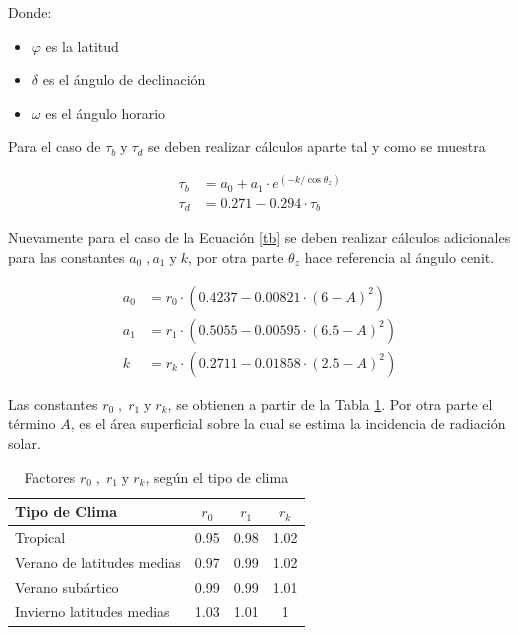 Donde:

\begin{itemize}
    \item $\varphi$ es la latitud
    \item $\delta$ es el ángulo de declinación
    \item $\omega$ es el ángulo horario
\end{itemize}

Para el caso de $\tau _{b}\; \textrm{y} \;\tau _{d}$ se deben realizar cálculos aparte tal y como se muestra

\begin{align}\label{tb}
    \tau _{b}&=a_{0}+a_{1}\cdot e^{(-k/\cos\theta _{z})}\\
    \tau _{d}&=0.271-0.294\cdot \tau _{b}
\end{align}

Nuevamente para el caso de la Ecuación \ref{tb} se deben realizar cálculos adicionales para las constantes $a_{0}\;,a_{1}\; \textrm{y}\; k$, por otra parte $\theta_{z}$ hace referencia al ángulo cenit.

\begin{align}
    a_{0}&=r_{0}\cdot (0.4237-0.00821\cdot (6-A)^{2})\\
    a_{1}&=r_{1}\cdot (0.5055-0.00595\cdot (6.5-A)^{2})\\
    k&=r_{k}\cdot (0.2711-0.01858\cdot (2.5-A)^{2})
\end{align}

Las constantes $r_{0}\;,\;r_{1}\;\textrm{y}\;r_{k}$, se obtienen a partir de la Tabla \ref{constantes solares}. Por otra parte el término $A$, es el área superficial sobre la cual se estima la incidencia de radiación solar.

\begin{table}[H]
\centering
\caption{Factores $r_{0}\;,\;r_{1}\;\textrm{y}\;r_{k}$, según el tipo de clima }
\label{constantes solares}
\begin{tabular}{lccc}
\toprule
\textbf{Tipo de Clima}     & \textbf{$r_{0}$} & \textbf{$r_{1}$} & \textbf{$r_{k}$} \\ \hline
Tropical                   & 0.95        & 0.98        & 1.02        \\
Verano de latitudes medias & 0.97        & 0.99        & 1.02        \\
Verano subártico           & 0.99        & 0.99        & 1.01        \\
Invierno latitudes medias  & 1.03        & 1.01        & 1           \\ \bottomrule
\end{tabular}
\end{table}

